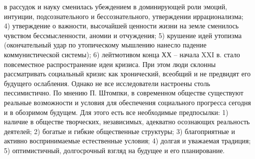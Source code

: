 \documentclass[12pt]{article}
\begin{document}
в рассудок и науку сменилась убеждением в доминирующей роли эмоций, интуиции, подсознательного и
бессознательного, утверждении иррационализма; 4) утверждение о важности, высочайшей ценности жизни на
земле сменилось чувством бессмысленности, аномии и отчуждения; 5) крушение идей утопизма
(окончательный удар по утопическому мышлению нанесло падение коммунистической системы); 6)
лейтмотивом конца ХХ – начала XXI в. стало повсеместное распространение идеи кризиса. При этом люди
склонны рассматривать социальный кризис как хронический, всеобщий и не предвидят его будущего
ослабления.
Однако не все исследователи настроены столь пессимистично. По мнению П. Штомпки, в современном
обществе существуют реальные возможности и условия для обеспечения социального прогресса сегодня и в
обозримом будущем. Для этого есть все необходимые предпосылки: 1) наличие в обществе творческих,
независимых, адекватно осознающих реальность деятелей; 2) богатые и гибкие общественные структуры; 3) 
благоприятные и активно воспринимаемые естественные условия; 4) долгая и уважаемая традиция; 5)
оптимистичный, долгосрочный взгляд на будущее и его планирование. 


\newpage
\end{document}
